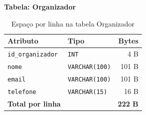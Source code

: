 \documentclass[runningheads]{llncs}
\begin{document}
                \vspace{0.4cm}
                \noindent\begin{minipage}{\textwidth}
                \noindent\textbf{Tabela: Organizador}\\[0.2cm]

                \begin{table}[H]
                \centering
                \renewcommand{\arraystretch}{1.3}
                \begin{tabular}{|l|l|r|}
                \hline
                \textbf{Atributo} & \textbf{Tipo} & \textbf{Bytes} \\ \hline
                \texttt{id\_organizador} & \texttt{INT}          & 4 B \\ \hline
                \texttt{nome}            & \texttt{VARCHAR(100)} & 101 B \\ \hline
                \texttt{email}           & \texttt{VARCHAR(100)} & 101 B \\ \hline
                \texttt{telefone}        & \texttt{VARCHAR(15)}  & 16 B \\ \hline
                \textbf{Total por linha} & & \textbf{222 B} \\ \hline
                \end{tabular}
                \vspace{0.2cm}
                \caption{Espaço por linha na tabela Organizador} \label{tab:bytes_organizador}
                \end{table}
                \end{minipage}
\end{document}
